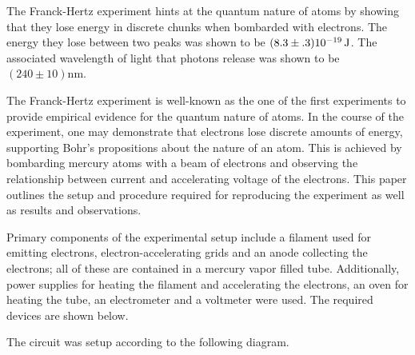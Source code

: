 
\physics

\begin{paperabs}

	The Franck-Hertz experiment hints at the quantum nature of atoms by showing that they lose energy in discrete chunks when bombarded with electrons.
The energy they lose between two peaks was shown to be $(8.3\pm.3)\SI{E-19}{\joule}$. The associated wavelength of light that photons release was shown to be $(240\pm10)\si{\nano\meter}$.
	
\end{paperabs}

\begin{paper}
	
	
	The Franck-Hertz experiment is well-known as the one of the first experiments to provide empirical evidence for the quantum nature of atoms. In the course of the experiment, one may demonstrate that electrons lose discrete amounts of energy, supporting Bohr's propositions about the nature of an atom. This is achieved by bombarding mercury atoms with a beam of electrons and observing the relationship between current and accelerating voltage of the electrons. This paper outlines the setup and procedure required for reproducing the experiment as well as results and observations. 
	
	Primary components of the experimental setup include a filament used for emitting electrons, electron-accelerating grids and an anode collecting the electrons; all of these are contained in a mercury vapor filled tube. Additionally, power supplies for heating the filament and accelerating the electrons, an oven for heating the tube, an electrometer and a voltmeter were used. The required devices are shown below.
	
	
	The circuit was setup according to the following diagram.

	\\


\end{paper}
